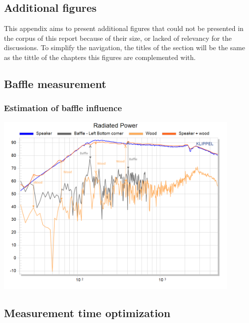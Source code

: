 \documentclass{report}
\begin{document}
\begin{appendices}
\chapter{Additional figures}
This appendix aims to present additional figures that could not be presented in the corpus of this report because of their size, or lacked of relevancy for the discussions. To simplify the navigation, the titles of the section will be the same as the tittle of the chapters this figures are complemented with. 


\section{Baffle measurement}
\subsection{Estimation of baffle influence}
\label{Curves:BaffleInfluence}

\begin{center}
	\includegraphics[width=0.9\textwidth]{Appendix/Vib_RadPow}
    \captionsetup{hypcap=false}
    \label{Curves:Baffle_RadPow}
\end{center}


\section{Measurement time optimization}

\end{appendices}
\end{document}
